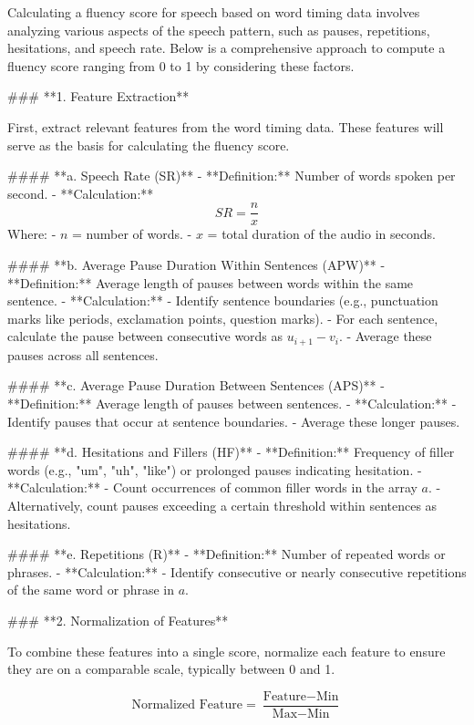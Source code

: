 Calculating a fluency score for speech based on word timing data involves analyzing various aspects of the speech pattern, such as pauses, repetitions, hesitations, and speech rate. Below is a comprehensive approach to compute a fluency score ranging from 0 to 1 by considering these factors.

### **1. Feature Extraction**

First, extract relevant features from the word timing data. These features will serve as the basis for calculating the fluency score.

#### **a. Speech Rate (SR)**
   - **Definition:** Number of words spoken per second.
   - **Calculation:**
     \[
     SR = \frac{n}{x}
     \]
     Where:
     - \( n \) = number of words.
     - \( x \) = total duration of the audio in seconds.

#### **b. Average Pause Duration Within Sentences (APW)**
   - **Definition:** Average length of pauses between words within the same sentence.
   - **Calculation:**
     - Identify sentence boundaries (e.g., punctuation marks like periods, exclamation points, question marks).
     - For each sentence, calculate the pause between consecutive words as \( u_{i+1} - v_i \).
     - Average these pauses across all sentences.

#### **c. Average Pause Duration Between Sentences (APS)**
   - **Definition:** Average length of pauses between sentences.
   - **Calculation:**
     - Identify pauses that occur at sentence boundaries.
     - Average these longer pauses.

#### **d. Hesitations and Fillers (HF)**
   - **Definition:** Frequency of filler words (e.g., "um", "uh", "like") or prolonged pauses indicating hesitation.
   - **Calculation:**
     - Count occurrences of common filler words in the array \( a \).
     - Alternatively, count pauses exceeding a certain threshold within sentences as hesitations.

#### **e. Repetitions (R)**
   - **Definition:** Number of repeated words or phrases.
   - **Calculation:**
     - Identify consecutive or nearly consecutive repetitions of the same word or phrase in \( a \).

### **2. Normalization of Features**

To combine these features into a single score, normalize each feature to ensure they are on a comparable scale, typically between 0 and 1.

\[
\text{Normalized Feature} = \frac{\text{Feature} - \text{Min}}{\text{Max} - \text{Min}}
\]

